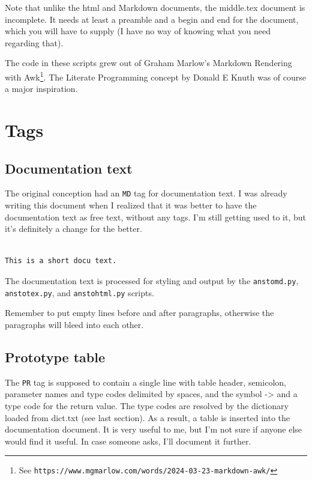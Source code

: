 \documentclass{report}
\begin{document}
\begin{pulledtext}

Note that unlike the html and Markdown documents, the middle.tex document is incomplete. It needs at least a preamble and a begin and end for the document, which you will have to supply (I have no way of knowing what you need regarding that).
\end{pulledtext}

The code in these scripts grew out of Graham Marlow's Markdown Rendering with Awk\footnote{See \texttt{https://www.mgmarlow.com/words/2024-03-23-markdown-awk/}}. The Literate Programming concept by Donald E Knuth was of course a major inspiration.

\chapter{Tags}
\label{tags}

\section{Documentation text}
\label{documentation-text}

The original conception had an \texttt{MD} tag for documentation text. I was already writing this document when I realized that it was better to have the documentation text as free text, without any tags. I'm still getting used to it, but it's definitely a change for the better.

\begin{verbatim}

This is a short docu text.

\end{verbatim}

The documentation text is processed for styling and output by the \texttt{anstomd.py}, \texttt{anstotex.py}, and \texttt{anstohtml.py} scripts.

Remember to put empty lines before and after paragraphs, otherwise the paragraphs will bleed into each other.

\section{Prototype table}
\label{prototype-table}

The \texttt{PR} tag is supposed to contain a single line with table header, semicolon, parameter names and type codes delimited by spaces, and the symbol -> and a type code for the return value. The type codes are resolved by the dictionary loaded from dict.txt (see last section). As a result, a table is inserted into the documentation document. It is very useful to me, but I'm not sure if anyone else would find it useful. In case someone asks, I'll document it further.
\end{document}
